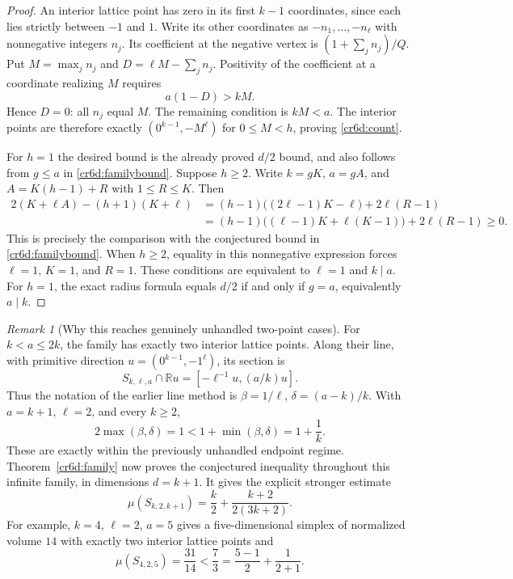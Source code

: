 \documentclass[11pt,a4paper]{article}
\theoremstyle{remark}\newtheorem{remark}[theorem]{Remark}
\begin{document}
\begin{proof}
An interior lattice point has zero in its first $k-1$
coordinates, since each lies strictly between $-1$ and $1$.
Write its other coordinates as $-n_1,\ldots,-n_\ell$ with
nonnegative integers $n_j$.  Its coefficient at the negative
vertex is $(1+\sum_jn_j)/Q$.  Put
$M=\max_jn_j$ and $D=\ell M-\sum_jn_j$.
Positivity of the coefficient at a coordinate realizing $M$
requires
\[
 a(1-D)>kM.
\]
Hence $D=0$: all $n_j$ equal $M$.  The remaining condition is
$kM<a$.  The interior points are therefore exactly
$(0^{k-1},-M^\ell)$ for $0\le M<h$, proving
\eqref{cr6d:count}.

For $h=1$ the desired bound is the already proved $d/2$
bound, and also follows from $g\le a$ in
\eqref{cr6d:familybound}.  Suppose $h\ge2$.
Write $k=gK$, $a=gA$, and
$A=K(h-1)+R$ with $1\le R\le K$.  Then
\[
 \begin{split}
 2(K+\ell A)-(h+1)(K+\ell)
 &=(h-1)\bigl((2\ell-1)K-\ell\bigr)
       +2\ell(R-1)\\
 &=(h-1)\bigl((\ell-1)K+\ell(K-1)\bigr)
       +2\ell(R-1)\ge0.
 \end{split}
 \]
This is precisely the comparison with the conjectured bound in
\eqref{cr6d:familybound}.  When $h\ge2$, equality in this
nonnegative expression forces $\ell=1$, $K=1$, and $R=1$.
These conditions are equivalent to $\ell=1$ and $k\mid a$.
For $h=1$, the exact radius formula equals $d/2$ if and only
if $g=a$, equivalently $a\mid k$.
\end{proof}

\begin{remark}[Why this reaches genuinely unhandled two-point cases]
For $k<a\le2k$, the family has exactly two interior lattice
points.  Along their line, with primitive direction
$u=(0^{k-1},-1^\ell)$, its section is
\[
 S_{k,\ell,a}\cap\mathbb Ru
 =[-\ell^{-1}u,(a/k)u].
\]
Thus the notation of the earlier line method is
$\beta=1/\ell$, $\delta=(a-k)/k$.  With
$a=k+1$, $\ell=2$, and every $k\ge2$,
\[
 2\max(\beta,\delta)=1
 <1+\min(\beta,\delta)=1+\frac1k .
\]
These are exactly within the previously unhandled endpoint
regime.  Theorem~\ref{cr6d:family} now proves the conjectured
inequality throughout this infinite family, in dimensions
$d=k+1$.  It gives the explicit stronger estimate
\[
 \mu(S_{k,2,k+1})
 = \frac{k}{2}+\frac{k+2}{2(3k+2)}.
\]
For example, $k=4$, $\ell=2$, $a=5$ gives a five-dimensional
simplex of normalized volume $14$ with exactly two interior
lattice points and
\[
 \mu(S_{4,2,5})=\frac{31}{14}<\frac73
 =\frac{5-1}{2}+\frac1{2+1}.
\]
\end{remark}
\end{document}

